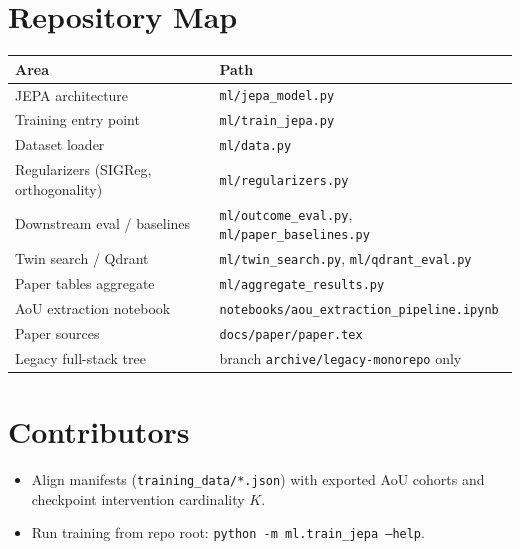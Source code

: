 \documentclass[11pt]{article}
\begin{document}
\section{Repository Map}
\begin{longtable}{p{} p{}}
\toprule
\textbf{Area} & \textbf{Path} \\
\midrule
JEPA architecture & \texttt{ml/jepa\_model.py} \\
Training entry point & \texttt{ml/train\_jepa.py} \\
Dataset loader & \texttt{ml/data.py} \\
Regularizers (SIGReg, orthogonality) & \texttt{ml/regularizers.py} \\
Downstream eval / baselines & \texttt{ml/outcome\_eval.py}, \texttt{ml/paper\_baselines.py} \\
Twin search / Qdrant & \texttt{ml/twin\_search.py}, \texttt{ml/qdrant\_eval.py} \\
Paper tables aggregate & \texttt{ml/aggregate\_results.py} \\
AoU extraction notebook & \texttt{notebooks/aou\_extraction\_pipeline.ipynb} \\
Paper sources & \texttt{docs/paper/paper.tex} \\
Legacy full-stack tree & branch \texttt{archive/legacy-monorepo} only \\
\bottomrule
\end{longtable}

\section{Contributors}
\begin{itemize}[leftmargin=1.5em]
  \item Align manifests (\texttt{training\_data/*.json}) with exported AoU cohorts and checkpoint intervention cardinality $K$.
  \item Run training from repo root: \texttt{python -m ml.train\_jepa --help}.
\end{itemize}
\end{document}
